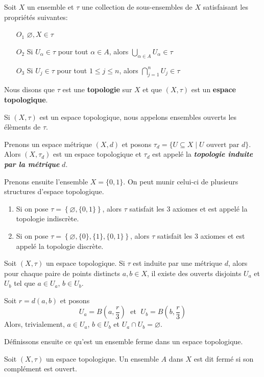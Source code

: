 \documentclass[french]{article}
\begin{document}
\begin{definition}
  Soit $X$ un ensemble et $\tau$ une collection de sous-ensembles de $X$ satisfaisant les propriétés suivantes:
  \begin{enumerate}
    \item[$O_1$] $\varnothing, X \in \tau$
    \item[$O_2$] Si $U_\alpha \in \tau$ pour tout $\alpha \in A$, alors $\bigcup\limits_{\alpha \in A} U_\alpha \in \tau$ 
    \item[$O_3$] Si $U_j \in \tau$ pour tout $1 \leq j \leq n$, alors $\bigcap\limits_{j=1}^{n} U_j \in \tau$
  \end{enumerate}
  Nous disons que $\tau$ est une \textbf{topologie} sur $X$ et que $(X, \tau)$ est un \textbf{espace topologique}.
\end{definition}
Si $(X, \tau)$ est un espace topologique, nous appelons ensembles ouverts les élèments de $\tau$.
\par Prenons un espace métrique $(X, d)$ et posons $\tau_d = \{U \subseteq X \mid U \text{ ouvert par } d\}$. Alors $(X, \tau_d)$ est un espace topologique et $\tau_d$ est appelé la \textbf{\it topologie induite par la métrique} $d$.
\par Prenons ensuite l'ensemble $X = \{0, 1\}$. On peut munir celui-ci de plusieurs structures d'espace topologique.
\begin{enumerate}
  \item Si on pose $\tau = \left\{ \varnothing, \{0, 1\} \right\}$, alors $\tau$ satisfait les 3 axiomes et est appelé la topologie indiscrète.
  \item Si on pose $\tau = \left\{ \varnothing, \{0\}, \{1\}, \{0, 1\} \right\}$, alors $\tau$ satisfait les 3 axiomes et est appelé la topologie discrète.
\end{enumerate}
\begin{lemme}
  Soit $(X, \tau)$ un espace topologique. Si $\tau$ est induite par une métrique $d$, alors pour chaque paire de points distincts $a, b \in X$, il existe des ouverts disjoints $U_a$ et $U_b$ tel que $a \in U_a$, $b \in U_b$.

  \tcblower
  \begin{preuve}
    Soit $r = d(a, b)$ et posons
    $$U_a = B\left(a, \frac{r}{3} \right) \; \text{ et } \; U_b = B\left(b, \frac{r}{3}\right)$$
    Alors, trivialement, $a \in U_a$, $b \in U_b$ et $U_a \cap U_b = \varnothing$.
  \end{preuve}
\end{lemme}
Définissons ensuite ce qu'est un ensemble ferme dans un espace topologique.
\begin{definition}
  Soit $(X, \tau)$ un espace topologique. Un ensemble $A$ dans $X$ est dit fermé si son complément est ouvert.
\end{definition}
\end{document}
